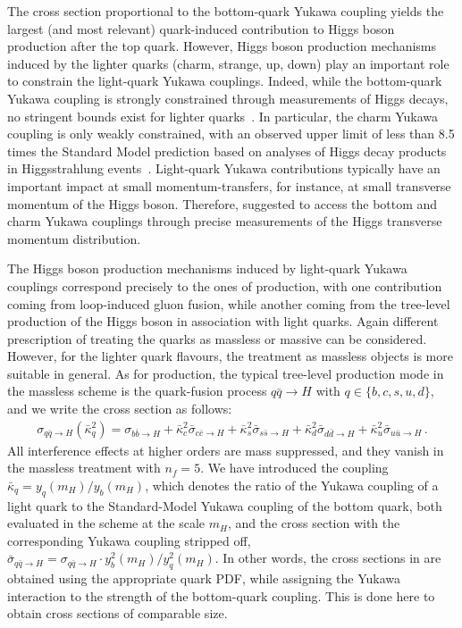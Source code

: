 \documentclass[11pt,a4paper]{article}
\begin{document}
The cross section proportional to the bottom-quark Yukawa coupling yields 
the largest (and most relevant) quark-induced contribution to Higgs boson production 
after the top quark. However, Higgs boson production mechanisms induced by the lighter 
quarks (charm, strange, up, down) play an important role to constrain 
the light-quark Yukawa couplings. 
Indeed, while the bottom-quark Yukawa coupling is strongly constrained through measurements of Higgs decays, no stringent bounds exist for lighter quarks~\cite{Kagan:2014ila}. 
 In particular, the charm Yukawa coupling is only weakly constrained, with an observed upper limit of less than 8.5 times the Standard Model prediction based on analyses of Higgs decay products in Higgsstrahlung events~\cite{Atlas:2022ers}. 
Light-quark Yukawa contributions typically have an important
impact at small momentum-transfers, for instance, at small transverse momentum
of the Higgs boson. Therefore,  suggested
to access the bottom and charm Yukawa couplings through precise measurements
of the Higgs transverse momentum distribution.

The Higgs boson production mechanisms induced by light-quark Yukawa couplings correspond
precisely to the ones of \bbH{} production, with one contribution coming from 
loop-induced gluon fusion, while another coming from the 
tree-level production of the Higgs boson in association with light quarks. Again different
prescription of treating the quarks as massless or massive can be considered. However,
for the lighter quark flavours, the treatment as massless objects is more suitable
in general. As for \bbH{} production, the 
typical tree-level production mode in the massless scheme 
is the quark-fusion process $q\bar q\to H$ with $q\in\{b,c,s,u,d\}$, 
and we write the cross section as follows:
\begin{align}
\label{eq:light-cs}
\sigma_{q\bar q \rightarrow H}(\bar \kappa_q^2)=\sigma_{b\bar b \rightarrow H}+\bar \kappa_c^2 \bar \sigma_{c\bar c \rightarrow H}+\bar \kappa_s^2 \bar \sigma_{s\bar s \rightarrow H}+\bar \kappa_d^2 \bar \sigma_{d\bar d \rightarrow H}+\bar \kappa_u^2 \bar \sigma_{u\bar u \rightarrow H}\,.
\end{align}
All interference effects at higher orders are mass suppressed, and they
vanish in the massless treatment with $ n_f = 5 $. 
We have introduced the coupling $\bar\kappa_q=y_q(m_H)/y_b(m_H)$, which denotes the ratio of the 
Yukawa coupling of a light quark to the Standard-Model Yukawa coupling of the bottom quark, both evaluated in the \MSbar{} scheme at the scale $m_H$, and the 
cross section with the corresponding Yukawa coupling stripped off, 
$\bar\sigma_{q\bar q\to H} =\sigma_{q\bar q\to H}\cdot y_b^2(m_H)/y_q^2(m_H)$.
In other words, the cross sections in  are obtained 
using the appropriate quark PDF, while assigning the Yukawa interaction 
to the strength of the bottom-quark coupling. This is done here to obtain cross sections of
comparable size.
\end{document}
